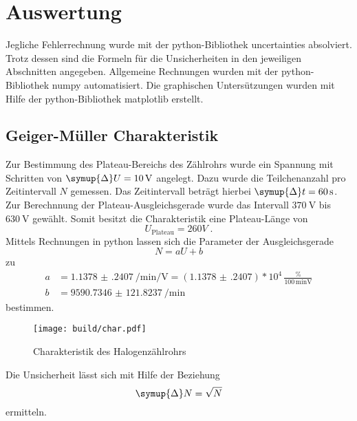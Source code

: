 \section{Auswertung}
Jegliche Fehlerrechnung wurde mit der python-Bibliothek uncertainties \cite{uncertainties} absolviert.
Trotz dessen sind die Formeln für die Unsicherheiten in den jeweiligen Abschnitten angegeben.
Allgemeine Rechnungen wurden mit der python-Bibliothek numpy \cite{numpy} automatisiert. 
Die graphischen Untersützungen wurden mit Hilfe der python-Bibliothek matplotlib \cite{matplotlib} erstellt.
\label{sec:Auswertung}
\subsection{Geiger-Müller Charakteristik}
Zur Bestimmung des Plateau-Bereichs des Zählrohrs wurde ein Spannung mit Schritten von $\symup{\Delta} U = \SI{10}{\volt}$ angelegt.
Dazu wurde die Teilchenanzahl pro Zeitintervall $N$ gemessen. 
Das Zeitintervall beträgt hierbei $\symup{\Delta} t = \SI{60}{\second}$.
Zur Berechnnung der Plateau-Ausgleichsgerade wurde das Intervall $\SI{370}{\volt}$ bis $\SI{630}{\volt}$ gewählt.
Somit besitzt die Charakteristik eine Plateau-Länge von 
\begin{equation*}
  U_\text{Plateau} = 260 V \;\text{.}
\end{equation*}
Mittels Rechnungen in python lassen sich die Parameter der Ausgleichsgerade 
\begin{equation}
  N = aU + b
\end{equation}
zu 
\begin{align*}
  a &= \SI{1.1378(2407)}{\per\minute\per\volt} = ( \num{1.1378(2407)}) * 10^4  \,\frac{\si{\percent}}{100 \, \si{\minute\volt}} \\
  b &= \SI{9590.7346(1218237)}{\per\minute}
\end{align*}
bestimmen.
\begin{figure}
  \centering
  \caption{Charakteristik des Halogenzählrohrs}
  \label{fig:char}
  \texttt{[image: build/char.pdf]}
\end{figure}
Die Unsicherheit lässt sich mit Hilfe der Beziehung 
\begin{equation}
  \symup{\Delta} N = \sqrt{N}
\end{equation}
ermitteln.
